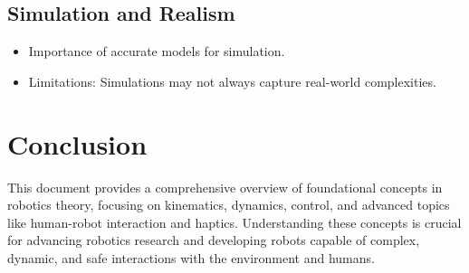 \documentclass{article}
\begin{document}
\subsection{Simulation and Realism}

\begin{itemize}
    \item Importance of accurate models for simulation.
    \item Limitations: Simulations may not always capture real-world complexities.
\end{itemize}

\section{Conclusion}

This document provides a comprehensive overview of foundational concepts in robotics theory, focusing on kinematics, dynamics, control, and advanced topics like human-robot interaction and haptics. Understanding these concepts is crucial for advancing robotics research and developing robots capable of complex, dynamic, and safe interactions with the environment and humans.
\end{document}
